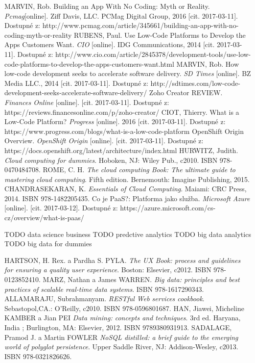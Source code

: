 \begin{thebibliography}{99}

MARVIN, Rob. Building an App With No Coding: Myth or Reality. 
\textit{Pcmag}[online].
 Ziff Davis, LLC. PCMag Digital Group, 2016 [cit. 2017-03-11]. Dostupné z: http://www.pcmag.com/article/345661/building-an-app-with-no-coding-myth-or-reality
RUBENS, Paul. Use Low-Code Platforms to Develop the Apps Customers Want.
\textit{CIO} [online].
IDG Communications, 2014 [cit. 2017-03-11]. Dostupné z: http://www.cio.com/article/2845378/development-tools/use-low-code-platforms-to-develop-the-apps-customers-want.html
MARVIN, Rob. How low-code development seeks to accelerate software delivery.
\textit{SD Times} [online].
BZ Media LLC., 2014 [cit. 2017-03-11]. Dostupné z: http://sdtimes.com/low-code-development-seeks-accelerate-software-delivery/
Zoho Creator REVIEW.
\textit{Finances Online} [online].
[cit. 2017-03-11]. Dostupné z: https://reviews.financesonline.com/p/zoho-creator/
CIOT, Thierry. What is a Low-Code Platform?
\textit{Progress} [online].
2016 [cit. 2017-03-11]. Dostupné z: https://www.progress.com/blogs/what-is-a-low-code-platform
OpenShift Origin Overview.
\textit{OpenShift Origin} [online].
[cit. 2017-03-11]. Dostupné z: https://docs.openshift.org/latest/architecture/index.html
HURWITZ, Judith.
\textit{Cloud computing for dummies}.
Hoboken, NJ: Wiley Pub., c2010. ISBN 978-0470484708.
ROME, C. H. 
\textit{The cloud computing Book: The ultimate guide to mastering cloud computing}.
Fifth edition. Bernemouth: Imagine Publishing, 2015.
CHANDRASEKARAN, K. 
\textit{Essentials of Cloud Computing}.
Maiami: CRC Press, 2014. ISBN 978-1482205435.
Co je PaaS?: Platforma jako služba.
\textit{Microsoft Azure} [online].
[cit. 2017-03-12]. Dostupné z: https://azure.microsoft.com/cs-cz/overview/what-is-paas/

TODO data science business
TODO predctive analytics
TODO big data analytics
TODO big data for dummies 

HARTSON, H. Rex. a Pardha S. PYLA.
\textit{The UX Book: process and guidelines for ensuring a quality user experience}. 
Boston: Elsevier, c2012. ISBN 978-0123852410.
MARZ, Nathan a James WARREN.
\textit{Big data: principles and best practices of scalable real-time data systems}. 
ISBN 978-1617290343.
ALLAMARAJU, Subrahmanyam.
\textit{RESTful Web services cookbook}.
Sebastopol,CA.: O'Reilly, c2010. ISBN 978-0596801687.
HAN, Jiawei, Micheline KAMBER a Jian PEI
\textit{Data mining: concepts and techniques}.
3rd ed. Haryana, India ; Burlington, MA: Elsevier, 2012. ISBN 9789380931913.
SADALAGE, Pramod J. a Martin FOWLER
\textit{NoSQL distilled: a brief guide to the emerging world of polyglot persistence}.
Upper Saddle River, NJ: Addison-Wesley, c2013. ISBN 978-0321826626.

\end{thebibliography}
